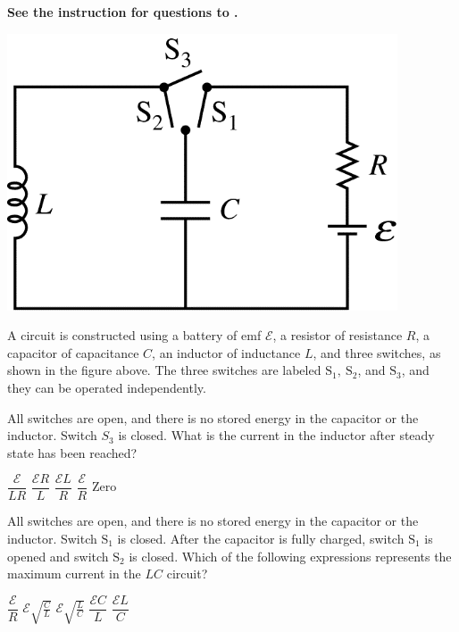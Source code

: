 
\textbf{See the instruction for questions  to .}

\begin{center}
    \includegraphics[scale=0.3]{images/img-011-019.png}
\end{center}

A circuit is constructed using a battery of emf $\mathcal{E}$, a resistor of resistance $R$, a capacitor of capacitance $C$, an inductor of inductance $L$, and three switches, as shown in the figure above. The three switches are labeled $\mathrm{S}_{1}, \mathrm{~S}_{2}$, and $\mathrm{S}_{3}$, and they can be operated independently.

\begin{questions}\setcounter{question}{19}\question
All switches are open, and there is no stored energy in the capacitor or the inductor. Switch $S_{3}$ is closed. What is the current in the inductor after steady state has been reached?

\begin{oneparchoices}
    \choice $\dfrac{\mathcal{E}}{L R}$
    \choice $\dfrac{\mathcal{E}R}{L}$
    \choice $\dfrac{\mathcal{E}L}{R}$
    \choice $\dfrac{\mathcal{E}}{R}$
    \choice Zero
\end{oneparchoices}
\end{questions}

\begin{questions}\setcounter{question}{20}\question
All switches are open, and there is no stored energy in the capacitor or the inductor. Switch $\mathrm{S}_{1}$ is closed. After the capacitor is fully charged, switch $\mathrm{S}_{1}$ is opened and switch $\mathrm{S}_{2}$ is closed. Which of the following expressions represents the maximum current in the $L C$ circuit?

\begin{oneparchoices}
    \choice $\dfrac{\mathcal{E}}{R}$
    \choice $\mathcal{E} \sqrt{\frac{C}{L}}$
    \choice $\mathcal{E} \sqrt{\frac{L}{C}}$
    \choice $\dfrac{\mathcal{E}C}{L}$
    \choice $\dfrac{\mathcal{E}L}{C}$
\end{oneparchoices}
\end{questions}

